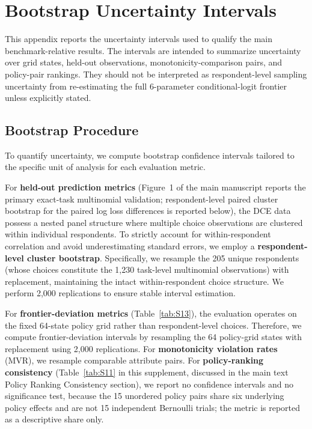 \documentclass[11pt]{article}
\begin{document}
\section{Bootstrap Uncertainty Intervals}
\label{app:bootstrap}

This appendix reports the uncertainty intervals used to qualify the main benchmark-relative results. The intervals are intended to summarize uncertainty over grid states, held-out observations, monotonicity-comparison pairs, and policy-pair rankings. They should not be interpreted as respondent-level sampling uncertainty from re-estimating the full 6-parameter conditional-logit frontier unless explicitly stated.

\subsection{Bootstrap Procedure}
\label{app:bootstrap_procedure}

To quantify uncertainty, we compute bootstrap confidence intervals tailored to the specific unit of analysis for each evaluation metric. 

For \textbf{held-out prediction metrics} (Figure~1 of the main manuscript reports the primary exact-task multinomial validation; respondent-level paired cluster bootstrap for the paired log loss differences is reported below), the DCE data possess a nested panel structure where multiple choice observations are clustered within individual respondents. To strictly account for within-respondent correlation and avoid underestimating standard errors, we employ a \textbf{respondent-level cluster bootstrap}. Specifically, we resample the 205 unique respondents (whose choices constitute the 1,230 task-level multinomial observations) with replacement, maintaining the intact within-respondent choice structure. We perform 2,000 replications to ensure stable interval estimation.

For \textbf{frontier-deviation metrics} (Table~\ref{tab:S13}), the evaluation operates on the fixed 64-state policy grid rather than respondent-level choices. Therefore, we compute frontier-deviation intervals by resampling the 64 policy-grid states with replacement using 2,000 replications. For \textbf{monotonicity violation rates} (MVR), we resample comparable attribute pairs. For \textbf{policy-ranking consistency} (Table~\ref{tab:S11} in this supplement, discussed in the main text Policy Ranking Consistency section), we report no confidence intervals and no significance test, because the 15 unordered policy pairs share six underlying policy effects and are not 15 independent Bernoulli trials; the metric is reported as a descriptive share only.
\end{document}
